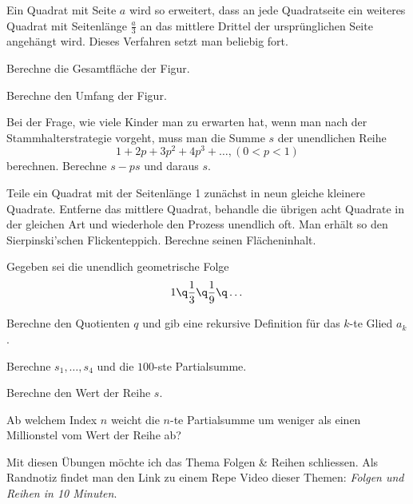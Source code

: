 \documentclass[%
11pt,%
twoside,%
titlepage,%
german,%
headsepline%
]{scrartcl}
\begin{document}
\begin{ueb}[Quadrat]
Ein Quadrat mit Seite $a$ wird so erweitert, dass an jede Quadratseite ein weiteres Quadrat mit Seitenl\"ange $\frac{a}{3}$ an das mittlere Drittel der urspr\"unglichen Seite angeh\"angt wird. Dieses Verfahren setzt man beliebig fort.
\begin{enumeratea}
\item Berechne die Gesamtfl\"ache der Figur.
\item Berechne den Umfang der Figur.
\end{enumeratea}
\end{ueb}

\begin{ueb}[Stammhalter]
Bei der Frage, wie viele Kinder man zu erwarten hat, wenn man nach der Stammhalterstrategie vorgeht, muss man die Summe $s$ der unendlichen Reihe
$$1 + 2p + 3p^2 + 4p^3 + \dots , ( 0 < p < 1)$$
berechnen. Berechne $s - ps$ und daraus $s$.
\end{ueb}

\begin{ueb}
Teile ein Quadrat mit der Seitenl\"ange 1 zun\"achst in neun gleiche kleinere Quadrate. Entferne das mittlere Quadrat, behandle die \"ubrigen acht Quadrate in der gleichen Art und wiederhole den Prozess unendlich oft. Man erh\"alt so den Sierpinski'schen Flickenteppich.
Berechne seinen Fl\"acheninhalt.
\end{ueb}

\pagebreak

\begin{ueb}
Gegeben sei die unendlich geometrische Folge
$$1\q\frac{1}{3}\q\frac{1}{9}\q\dots$$
\begin{enumeratea}
\item Berechne den Quotienten $q$ und gib eine rekursive Definition f\"ur das $k$-te Glied $a_k$.
\item Berechne $s_1,\dots,s_4$ und die $100$-ste Partialsumme.
\item Berechne den Wert der Reihe $s$.
\item Ab welchem Index $n$ weicht die $n$-te Partialsumme um weniger als einen Millionstel vom Wert der Reihe ab?
\end{enumeratea}
\end{ueb}

Mit
diesen Übungen möchte ich das Thema Folgen \& Reihen schliessen. Als Randnotiz findet man den Link zu einem Repe Video dieser Themen: \emph{Folgen und Reihen in 10 Minuten}.
\end{document}
